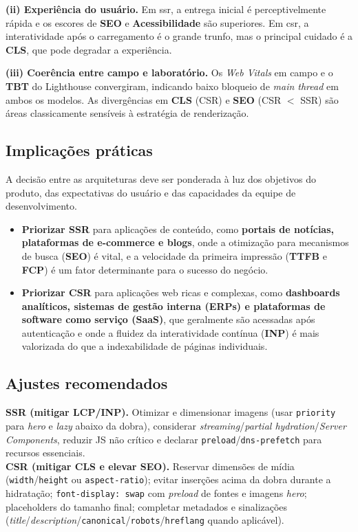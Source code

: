 \textbf{(ii) Experiência do usuário.} Em \acrshort{ssr}, a entrega inicial é perceptivelmente rápida e os escores de \textbf{SEO} e \textbf{Acessibilidade} são superiores. Em \acrshort{csr}, a interatividade após o carregamento é o grande trunfo, mas o principal cuidado é a \textbf{CLS}, que pode degradar a experiência.

\textbf{(iii) Coerência entre campo e laboratório.} Os \textit{Web Vitals} em campo e o \textbf{TBT} do Lighthouse convergiram, indicando baixo bloqueio de \emph{main thread} em ambos os modelos. As divergências em \textbf{CLS} (CSR) e \textbf{SEO} (CSR $<$ SSR) são áreas classicamente sensíveis à estratégia de renderização.

\subsection{Implicações práticas}
A decisão entre as arquiteturas deve ser ponderada à luz dos objetivos do produto, das expectativas do usuário e das capacidades da equipe de desenvolvimento.
\begin{itemize}
    \item \textbf{Priorizar SSR} para aplicações de conteúdo, como \textbf{portais de notícias, plataformas de e-commerce e blogs}, onde a otimização para mecanismos de busca (\textbf{SEO}) é vital, e a velocidade da primeira impressão (\textbf{TTFB} e \textbf{FCP}) é um fator determinante para o sucesso do negócio.
    \item \textbf{Priorizar CSR} para aplicações web ricas e complexas, como \textbf{dashboards analíticos, sistemas de gestão interna (ERPs) e plataformas de software como serviço (SaaS)}, que geralmente são acessadas após autenticação e onde a fluidez da interatividade contínua (\textbf{INP}) é mais valorizada do que a indexabilidade de páginas individuais.
\end{itemize}

\subsection{Ajustes recomendados}
\textbf{SSR (mitigar LCP/INP).} Otimizar e dimensionar imagens (usar \texttt{priority} para \emph{hero} e \emph{lazy} abaixo da dobra), considerar \emph{streaming}/\emph{partial hydration}/\emph{Server Components}, reduzir JS não crítico e declarar \texttt{preload}/\texttt{dns-prefetch} para recursos essenciais. \\
\textbf{CSR (mitigar CLS e elevar SEO).} Reservar dimensões de mídia (\texttt{width}/\texttt{height} ou \texttt{aspect-ratio}); evitar inserções acima da dobra durante a hidratação; \texttt{font-display: swap} com \emph{preload} de fontes e imagens \emph{hero}; placeholders do tamanho final; completar metadados e sinalizações (\emph{title}/\emph{description}/\texttt{canonical}/\texttt{robots}/\texttt{hreflang} quando aplicável).

